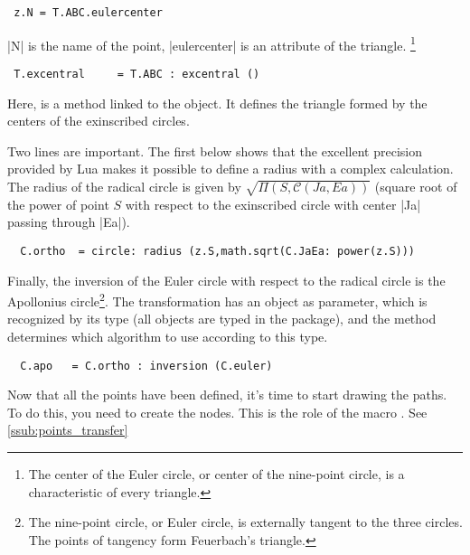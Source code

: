 \vspace{1em}
\begin{mybox}
\begin{verbatim}
 z.N = T.ABC.eulercenter \end{verbatim}
\end{mybox}

|N| is the name of the point, |eulercenter| is an attribute of the triangle.
\footnote{ The center of the Euler circle, or center of the nine-point circle, is a characteristic of every triangle.}

\begin{mybox}
\begin{verbatim}
 T.excentral     = T.ABC : excentral () \end{verbatim}
\end{mybox}

Here,  is a method linked to the object. It defines the triangle formed by the centers of the exinscribed circles. 

Two lines are important. The first below shows that the excellent precision provided by Lua makes it possible to define a radius with a complex calculation. The radius of the radical circle is given by $\sqrt{\Pi(S,\mathcal{C}(Ja,Ea))}$ (square root of the power of point $S$ with respect to the exinscribed circle with center |Ja| passing through |Ea|). 

\begin{mybox}
\begin{verbatim}
  C.ortho  = circle: radius (z.S,math.sqrt(C.JaEa: power(z.S)))\end{verbatim}
\end{mybox}

Finally, the inversion of the Euler circle with respect to the radical circle is the Apollonius circle\footnote{The nine-point circle, or Euler circle, is externally tangent to the three circles. The points of tangency form Feuerbach's triangle.}. The transformation has an object as parameter, which is recognized by its type (all objects are typed in the package), and the method determines which algorithm to use according to this type.

\begin{mybox}
\begin{verbatim}
  C.apo   = C.ortho : inversion (C.euler) \end{verbatim}
\end{mybox}

Now that all the points have been defined, it's time to start drawing the paths. To do this, you need to create the nodes. This is the role of the macro . See \ref{ssub:points_transfer}

